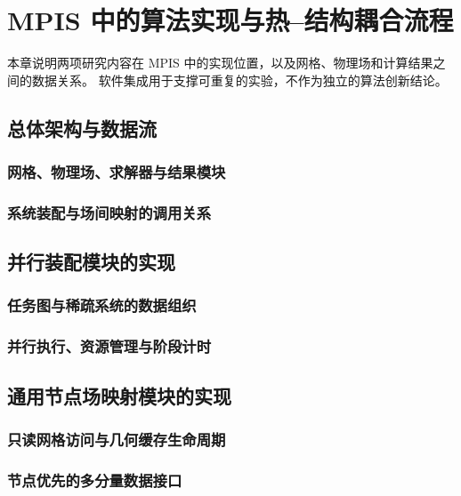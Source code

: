 \chapter{MPIS 中的算法实现与热--结构耦合流程}
\label{chap:implementation}

本章说明两项研究内容在 MPIS 中的实现位置，以及网格、物理场和计算结果之间的数据关系。
软件集成用于支撑可重复的实验，不作为独立的算法创新结论。

\section{总体架构与数据流}
\subsection{网格、物理场、求解器与结果模块}
\thesisdraftnote

\subsection{系统装配与场间映射的调用关系}
\thesisdraftnote

\section{并行装配模块的实现}
\subsection{任务图与稀疏系统的数据组织}
\thesisdraftnote

\subsection{并行执行、资源管理与阶段计时}
\thesisdraftnote

\section{通用节点场映射模块的实现}
\subsection{只读网格访问与几何缓存生命周期}
\thesisdraftnote

\subsection{节点优先的多分量数据接口}
\thesisdraftnote

